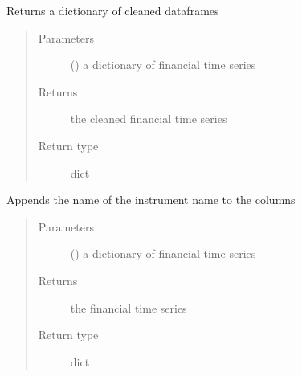\documentclass[letterpaper,10pt,english]{sphinxmanual}
\begin{document}
\begin{fulllineitems}
\label{\detokenize{index:Src.preprocessing.clean_dict_gen}}
Returns a dictionary of cleaned dataframes
\begin{quote}\begin{description}
\item[{Parameters}] \leavevmode
{} () \textendash{} a dictionary of financial time series

\item[{Returns}] \leavevmode
the cleaned financial time series

\item[{Return type}] \leavevmode
dict

\end{description}\end{quote}

\end{fulllineitems}


\begin{fulllineitems}
\label{\detokenize{index:Src.preprocessing.column_rename}}
Appends the name of the instrument
name to the columns
\begin{quote}\begin{description}
\item[{Parameters}] \leavevmode
{} () \textendash{} a dictionary of financial time series

\item[{Returns}] \leavevmode
the financial time series

\item[{Return type}] \leavevmode
dict

\end{description}\end{quote}

\end{fulllineitems}
\end{document}
